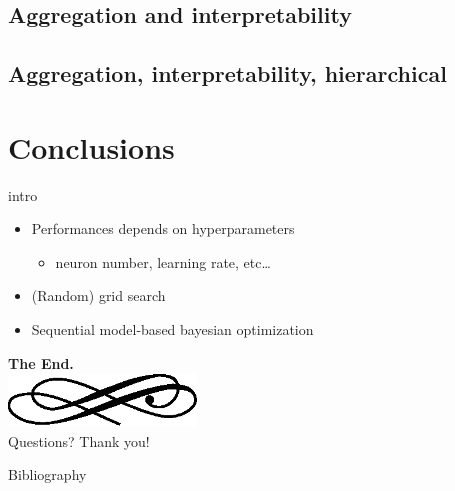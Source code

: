 \subsection{Aggregation and interpretability}

\subsection{Aggregation, interpretability, hierarchical}

\section{Conclusions}




\begin{frame}{intro}
  \begin{itemize}
  \item \alert{Performances} depends on hyperparameters
    \begin{itemize}
    \item neuron number, learning rate, etc\dots
    \end{itemize}
  \item (Random) grid search
  \item Sequential model-based bayesian optimization
  \end{itemize}  
\end{frame}

\begin{frame}
  \begin{center}
    \textbf{\calligra\Huge The End.}\\
    \includegraphics[width=5cm]{img/ornament.eps}\\[1cm]
    {\huge\calligra Questions? Thank you!}
  \end{center}
\end{frame}


\backupbegin

\begin{frame}[allowframebreaks]{Bibliography}
  \scriptsize
  
\end{frame}


\backupend



